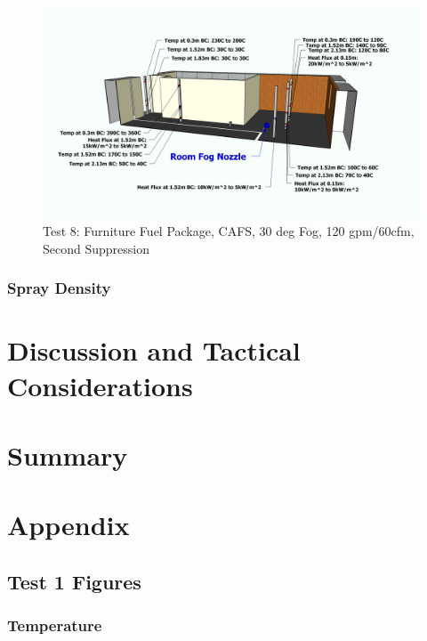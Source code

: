 \documentclass[12pt,oneside]{book}
\begin{document}
\begin{figure}[!ht]
	\includegraphics[width=6in]{../Figures/Pictures/Metric/DelCoFogTest8SecondSuppression}
	\caption{Test 8: Furniture Fuel Package, CAFS, 30 deg Fog, 120 gpm/60cfm, Second Suppression}
	\label{fig:Test_8_Second_Suppression}
\end{figure}

\subsection{Spray Density}
\label{subsec:Spray_Density}
	
\chapter{Discussion and Tactical Considerations}
\label{chap:Discussion_and_Tactical_Considerations}

\chapter{Summary}
\label{chap:Summary}

\chapter{Appendix}
\label{chap:Appendix}

\section{Test 1 Figures}
\label{subsec:Test_1_Figures}

\subsection{Temperature}
\label{subsec:Temperature}
\end{document}
